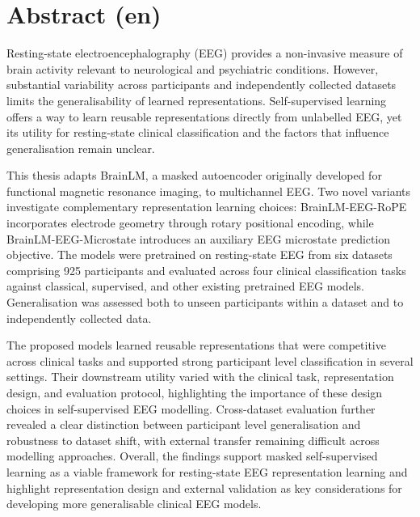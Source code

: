 
\section*{Abstract (en)}

Resting-state electroencephalography (EEG) provides a non-invasive measure of brain activity relevant to neurological and psychiatric conditions. However, substantial variability across participants and independently collected datasets limits the generalisability of learned representations. Self-supervised learning offers a way to learn reusable representations directly from unlabelled EEG, yet its utility for resting-state clinical classification and the factors that influence generalisation remain unclear.

This thesis adapts BrainLM, a masked autoencoder originally developed for functional magnetic resonance imaging, to multichannel EEG. Two novel variants investigate complementary representation learning choices: BrainLM-EEG-RoPE incorporates electrode geometry through rotary positional encoding, while BrainLM-EEG-Microstate introduces an auxiliary EEG microstate prediction objective. The models were pretrained on resting-state EEG from six datasets comprising 925 participants and evaluated across four clinical classification tasks against classical, supervised, and other existing pretrained EEG models. Generalisation was assessed both to unseen participants within a dataset and to independently collected data.

The proposed models learned reusable representations that were competitive across clinical tasks and supported strong participant level classification in several settings. Their downstream utility varied with the clinical task, representation design, and evaluation protocol, highlighting the importance of these design choices in self-supervised EEG modelling. Cross-dataset evaluation further revealed a clear distinction between participant level generalisation and robustness to dataset shift, with external transfer remaining difficult across modelling approaches. Overall, the findings support masked self-supervised learning as a viable framework for resting-state EEG representation learning and highlight representation design and external validation as key considerations for developing more generalisable clinical EEG models.




